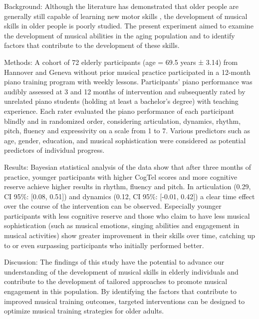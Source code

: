 Background: Although the literature has demonstrated that older people are generally still capable of learning new motor skills \cite{Boyke2008, Anguera2013, Altenmuller2020}, the development of musical skills in older people is poorly studied. The present experiment aimed to examine the development of musical abilities in the aging population and to identify factors that contribute to the development of these skills.

Methods: A cohort of 72 elderly participants (age = 69.5 years ± 3.14) from Hannover and Geneva without prior musical practice participated in a 12-month piano training program with weekly lessons. Participants’ piano performance was audibly assessed at 3 and 12 months of intervention and subsequently rated by unrelated piano students (holding at least a bachelor’s degree) with teaching experience. Each rater evaluated the piano performance of each participant blindly and in randomized order, considering articulation, dynamics, rhythm, pitch, fluency and expressivity on a scale from 1 to 7. Various predictors such as age, gender, education, and musical sophistication were considered as potential predictors of individual progress.

Results: Bayesian statistical analysis of the data show that after three months of practice, younger participants with higher CogTel scores and more cognitive reserve achieve higher results in rhythm, fluency and pitch. In articulation (0.29, CI 95\%: [0.08, 0.51]) and dynamics (0.12, CI 95\%: [-0.01, 0.42]) a clear time effect over the course of the intervention can be observed. Especially younger participants with less cognitive reserve and those who claim to have less musical sophistication (such as musical emotions, singing abilities and engagement in musical activities) show greater improvement in their skills over time, catching up to or even surpassing participants who initially performed better.

Discussion: The findings of this study have the potential to advance our understanding of the development of musical skills in elderly individuals and contribute to the development of tailored approaches to promote musical engagement in this population. By identifying the factors that contribute to improved musical training outcomes, targeted interventions can be designed to optimize musical training strategies for older adults.